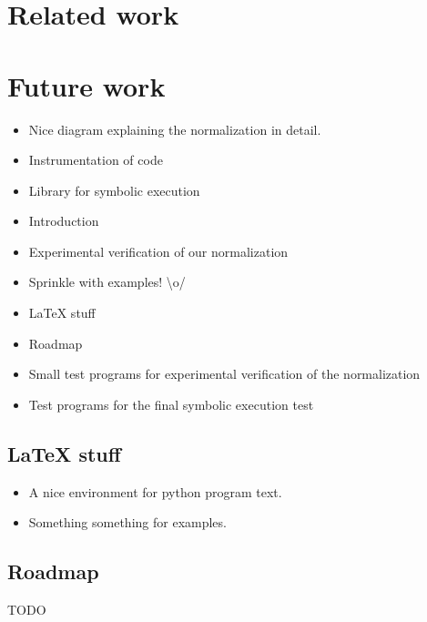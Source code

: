 \documentclass[a4paper]{article}
\begin{document}
\section*{Related work}

\section*{Future work}

\begin{itemize}
  \item Nice diagram explaining the normalization in detail.
  \item Instrumentation of code
  \item Library for symbolic execution
  \item Introduction 
  \item Experimental verification of our normalization
  \item Sprinkle with examples! \textbackslash{}o/
  \item \LaTeX{} stuff
  \item Roadmap
  \item Small test programs for experimental verification of the normalization
  \item Test programs for the final symbolic execution test
\end{itemize}

\subsection*{\LaTeX{} stuff}

\begin{itemize}
  \item A nice environment for python program text.
  \item Something something for examples.
\end{itemize}

\subsection*{Roadmap}

TODO
\end{document}
